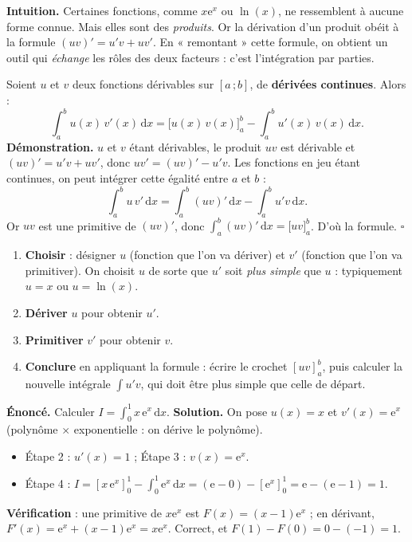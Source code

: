 \documentclass[11pt]{article}
\newcommand{\cle}[1]{{\popxbold\color{popdark}#1}}
\newcounter{popsec}
\newcounter{popsub}
\newcommand{\courssub}[1]{%
  \stepcounter{popsub}%
  \par\vspace{9pt}\noindent{\popxbold\fontsize{11.5}{13}\selectfont\color{popink}{\color{poporange}\thepopsec.\thepopsub}\hspace{6pt}#1}\par\nopagebreak\vspace{4pt}
}
\begin{document}
\courssub{Intégration par parties}

\textbf{Intuition.} Certaines fonctions, comme $x\mathrm{e}^x$ ou $\ln(x)$, ne ressemblent à aucune forme connue. Mais elles sont des \emph{produits}. Or la dérivation d'un produit obéit à la formule $(uv)'=u'v+uv'$. En « remontant » cette formule, on obtient un outil qui \emph{échange} les rôles des deux facteurs : c'est l'\cle{intégration par parties}.

\begin{propriete}
Soient $u$ et $v$ deux fonctions dérivables sur $[a\,;b]$, de \textbf{dérivées continues}. Alors :
\[ \int_a^b u(x)\,v'(x)\,\mathrm{d}x = \big[u(x)\,v(x)\big]_a^b - \int_a^b u'(x)\,v(x)\,\mathrm{d}x. \]
\textbf{Démonstration.} $u$ et $v$ étant dérivables, le produit $uv$ est dérivable et $(uv)' = u'v + uv'$, donc $uv' = (uv)' - u'v$. Les fonctions en jeu étant continues, on peut intégrer cette égalité entre $a$ et $b$ :
\[ \int_a^b u\,v'\,\mathrm{d}x = \int_a^b (uv)'\,\mathrm{d}x - \int_a^b u'v\,\mathrm{d}x. \]
Or $uv$ est une primitive de $(uv)'$, donc $\displaystyle\int_a^b (uv)'\,\mathrm{d}x = \big[uv\big]_a^b$. D'où la formule. $\square$
\end{propriete}

\begin{methode}
\begin{enumerate}
\item \textbf{Choisir} : désigner $u$ (fonction que l'on va dériver) et $v'$ (fonction que l'on va primitiver). On choisit $u$ de sorte que $u'$ soit \emph{plus simple} que $u$ : typiquement $u=x$ ou $u=\ln(x)$.
\item \textbf{Dériver} $u$ pour obtenir $u'$.
\item \textbf{Primitiver} $v'$ pour obtenir $v$.
\item \textbf{Conclure} en appliquant la formule : écrire le crochet $[uv]_a^b$, puis calculer la nouvelle intégrale $\int u'v$, qui doit être plus simple que celle de départ.
\end{enumerate}
\end{methode}

\begin{exoresolu}
\textbf{Énoncé.} Calculer $I=\displaystyle\int_0^1 x\,\mathrm{e}^x\,\mathrm{d}x$.
\tcblower
\textbf{Solution.} On pose $u(x)=x$ et $v'(x)=\mathrm{e}^x$ (polynôme $\times$ exponentielle : on dérive le polynôme).
\begin{itemize}
\item Étape 2 : $u'(x)=1$ ; Étape 3 : $v(x)=\mathrm{e}^x$.
\item Étape 4 : $I = \left[x\,\mathrm{e}^x\right]_0^1 - \displaystyle\int_0^1 \mathrm{e}^x\,\mathrm{d}x = \left(\mathrm{e}-0\right) - \left[\mathrm{e}^x\right]_0^1 = \mathrm{e}-(\mathrm{e}-1) = 1$.
\end{itemize}
\textbf{Vérification} : une primitive de $x\mathrm{e}^x$ est $F(x)=(x-1)\mathrm{e}^x$ ; en dérivant, $F'(x)=\mathrm{e}^x+(x-1)\mathrm{e}^x = x\mathrm{e}^x$. Correct, et $F(1)-F(0)=0-(-1)=1$.
\end{exoresolu}
\end{document}
